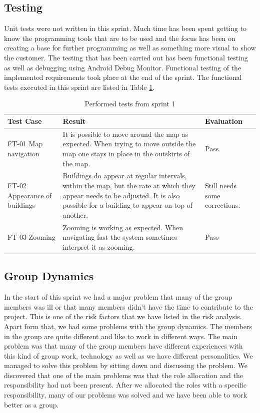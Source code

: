 \subsection{Testing}
	Unit tests were not written in this sprint. Much time has been spent getting to know 
	the programming tools that are to be used and the focus has been on creating a base for further 
	programming as well as something more visual to show the customer. The testing that has been 
	carried out has been functional testing as well as debugging using Android Debug Monitor. Functional 
	testing of the implemented requirements took place at the end of the sprint. The functional tests 
	executed in this sprint are listed in Table \ref{table:testsprint1}.


\begin{table}[H]
\begin{tabular}{| p{3cm} | p{7cm} | p{2cm} |}
	\hline
	\rowcolor{lightgray}
	{\bf Test Case} & {\bf Result} & {\bf Evaluation} \\ \hline
	FT-01 Map navigation & It is possible to move around the map as expected. When trying to move outside the map one stays in place in the outskirts of the map. & Pass. \\ \hline
  	FT-02 Appearance of buildings & Buildings do appear at regular intervals, within the map, but the rate at which they appear needs to be adjusted. It is also possible for a building to appear on top of another. & Still needs some corrections. \\ \hline
	FT-03 Zooming & Zooming is working as expected. When navigating fast the system sometimes interpret it as zooming. & Pass \\ \hline
\end{tabular}
\caption{Performed tests from sprint 1}
\label{table:testsprint1}
\end{table}

\subsection{Group Dynamics}
	In the start of this sprint we had a major problem that many of the group members was ill or 
	that many members didn't have the time to contribute to the project. 
	This is one of the risk factors 
	that we have listed in the risk analysis. 
	Apart form that, we had some problems with the group dynamics. The members in the group are 
	quite different and like to work in different ways. The main problem was 
	that many of the group members
	have different experiences with this kind of group work, technology as well as we have 
	different personalities.
	We managed to solve this problem by sitting down and discussing the problem. We discovered that
	one of the main problems was that the role allocation and the responsibility had not 
	been present.
	After we allocated the roles with a specific responsibility, many of our problems was solved and
	we have been able to work better as a group.

